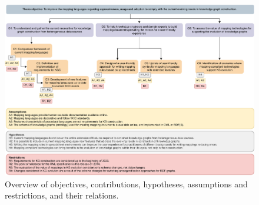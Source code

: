 \begin{figure}
    \centering
    \includegraphics[width=1\linewidth]{figures/chp3_summary.pdf}
    \caption[summary]{Overview of objectives, contributions, hypotheses, assumptions and restrictions, and their relations.}
    \label{fig:chp3_summary}
\end{figure}